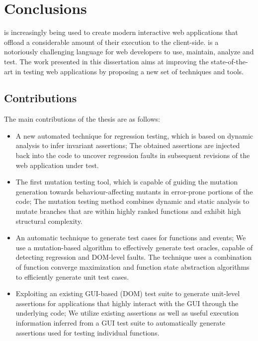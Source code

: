 \chapter{Conclusions} \label{Chap:conc}
\javascript is increasingly being used to create modern interactive web applications that offload a considerable amount of their execution to the client-side. \javascript is a notoriously challenging language for web developers to use, maintain, analyze and test. %
The work presented in this dissertation aims at improving the state-of-the-art in testing \javascript web applications by proposing a new set of techniques and tools.
\section{Contributions}
The main contributions of the thesis are as follows: 
\begin{itemize}
\item A new automated technique for \javascript regression testing, which is based on dynamic analysis to infer invariant assertions; The obtained assertions are injected back into the \javascript code to uncover regression faults in subsequent revisions of the web application under test. 
\item The first \javascript mutation testing tool, which is capable of guiding the mutation generation towards behaviour-affecting mutants in error-prone portions of the code; The mutation testing method combines dynamic and static analysis to mutate branches that are within highly ranked functions and exhibit high structural complexity.
\item An automatic technique to generate test cases for \javascript functions and events; We use a mutation-based algorithm to effectively generate test oracles, capable of detecting regression \javascript and DOM-level faults. The technique uses a combination of function converge maximization and function state abstraction algorithms to efficiently generate unit test cases.
\item Exploiting an existing GUI-based (\ie DOM) test suite to generate unit-level assertions for applications that highly interact with the GUI through the underlying \javascript code; We utilize
existing assertions as well as useful execution information inferred from a GUI test suite to automatically generate assertions used for testing individual \javascript functions.
\end{itemize}
